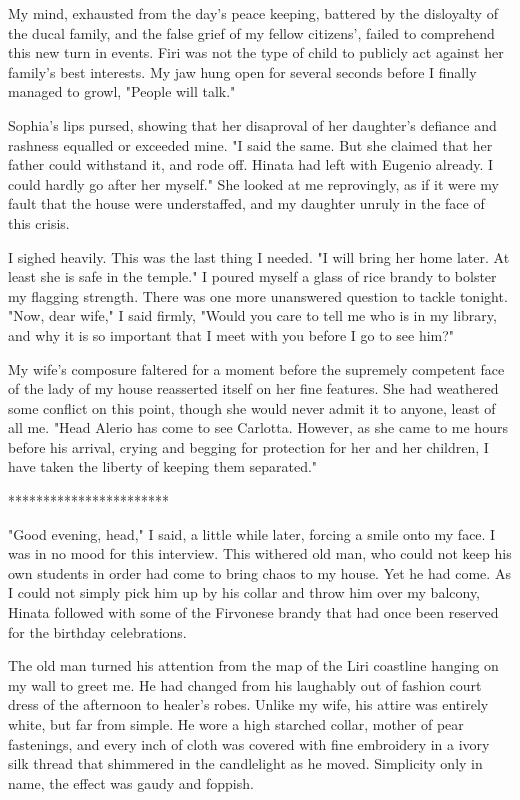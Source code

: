 \documentclass{article}
\begin{document}
My mind, exhausted from the day's peace keeping, battered by the disloyalty of the ducal family, and the false grief of my fellow citizens', failed to comprehend this new turn in events. Firi was not the type of child to publicly act against her family's best interests. My jaw hung open for several seconds before I finally managed to growl, "People will talk."

Sophia's lips pursed, showing that her disaproval of her daughter's defiance and rashness equalled or exceeded mine. "I said the same. But she claimed that her father could withstand it, and rode off. Hinata had left with Eugenio already. I could hardly go after her myself." She looked at me reprovingly, as if it were my fault that the house were understaffed, and my daughter unruly in the face of this crisis.

I sighed heavily. This was the last thing I needed. "I will bring her home later. At least she is safe in the temple." I poured myself a glass of rice brandy to bolster my flagging strength. There was one more unanswered question to tackle tonight. "Now, dear wife," I said firmly, "Would you care to tell me who is in my library, and why it is so important that I meet with you before I go to see him?"

My wife's composure faltered for a moment before the supremely competent face of the lady of my house reasserted
itself on her fine features. She had weathered some conflict on this point, though she would never admit it to anyone, least of all me. "Head Alerio has come to see Carlotta. However, as she came to me hours before his arrival, crying and begging for protection for her and her children, I have taken the liberty of keeping them separated."

***********************

"Good evening, head," I said, a little while later, forcing a smile onto my face. I was in no mood for this interview. This withered old man, who could not keep his own students in order had come to bring chaos to my house. Yet he had come. As I could not simply pick him up by his collar and throw him over my balcony, Hinata followed with some of the Firvonese brandy that had once been reserved for the birthday celebrations.

The old man turned his attention from the map of the Liri coastline hanging on my wall to greet me. He had changed from his laughably out of fashion court dress of the afternoon to healer's robes. Unlike my wife, his attire was entirely white, but far from simple. He wore a high starched collar, mother of pear fastenings, and every inch of cloth was covered with fine embroidery in a ivory silk thread that shimmered in the candlelight as he moved. Simplicity only in name, the effect was gaudy and foppish.
\end{document}
